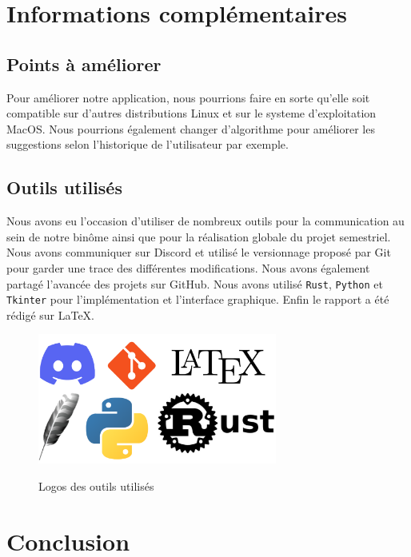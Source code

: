 \documentclass[a4paper, 11pt]{report}
\newcommand{\langage}[1]{\texttt{#1}}
\begin{document}
{\chapter{Informations complémentaires}

\section{Points à améliorer}

Pour améliorer notre application, nous pourrions faire en sorte qu'elle soit compatible sur d'autres distributions Linux et sur le systeme d'exploitation MacOS. Nous pourrions également changer d'algorithme pour améliorer les suggestions selon l'historique de l'utilisateur par exemple.


\section{Outils utilisés}

Nous avons eu l'occasion d'utiliser de  nombreux outils pour la communication au sein de notre binôme ainsi que pour la réalisation globale du projet semestriel. Nous avons communiquer sur Discord et utilisé le versionnage proposé par Git pour garder une trace des différentes modifications. Nous avons également partagé l'avancée des projets sur GitHub. Nous avons utilisé \langage{Rust}, \langage{Python} et \langage{Tkinter} pour l'implémentation et l'interface graphique. Enfin le rapport a été rédigé sur \LaTeX{}.

\begin{figure}[H]
	\begin{center}
		{\includegraphics[width=0.7\textwidth]{images/outils.png}}
	\end{center}
	\caption{Logos des outils utilisés}
	\label{fig:outils}
\end{figure}
\chapter*{Conclusion}

}
\end{document}
